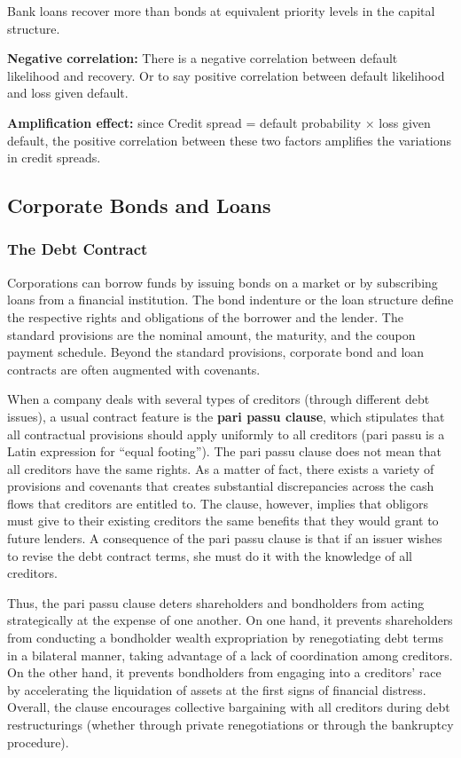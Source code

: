 \documentclass[12pt,a4paper]{article}
\begin{document}
\noindent Bank loans recover more than bonds at equivalent priority levels in the capital structure.

\textbf{Negative correlation:} There is a negative correlation between default likelihood and recovery. Or to say positive correlation between default likelihood and loss given default. 

\textbf{Amplification effect:} since Credit spread = default probability $\times$ loss given default,  the positive correlation between these two factors amplifies 
the variations in credit spreads.


\subsection{Corporate Bonds and Loans}
\subsubsection{The Debt Contract}

Corporations can borrow funds by issuing bonds on a market or by subscribing loans from a financial institution. The bond indenture or the loan structure define the respective rights and obligations of the borrower and the lender. The standard provisions are the nominal amount, the maturity, and the coupon payment schedule. Beyond the standard provisions, corporate bond and loan contracts are often augmented with covenants.

When a company deals with several types of creditors (through different debt issues), a usual contract feature is the \textbf{pari passu clause}, which stipulates that all contractual provisions should apply uniformly to all creditors (pari passu is a Latin expression for ``equal footing''). The pari passu clause does not mean that all creditors have the same rights. As a matter of fact, there exists a variety of provisions and covenants that creates substantial discrepancies across the cash flows that creditors are entitled to. The clause, however, implies that obligors must give to their existing creditors the same benefits that they would grant to future lenders. A consequence of the pari passu clause is that if an issuer wishes to revise the debt contract terms, she must do it with the knowledge of all creditors.

Thus, the pari passu clause deters shareholders and bondholders from acting strategically at the expense of one another. On one hand, it prevents shareholders from conducting a bondholder wealth expropriation by renegotiating debt terms in a bilateral manner, taking advantage of a lack of coordination among creditors. On the other hand, it prevents bondholders from engaging into a creditors' race by accelerating the liquidation of assets at the first signs of financial distress. Overall, the clause encourages collective bargaining with all creditors during debt restructurings (whether through private renegotiations or through the bankruptcy procedure).
\end{document}
